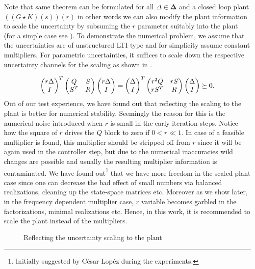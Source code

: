 \begin{rem}

Note that same theorem can be formulated for all $\Delta\in\bm{\Delta}$ and a closed loop plant $\left((G\star K) (s) \right)(r)$
in other words we can also modify the plant information to scale the uncertainty by subsuming the $r$ parameter suitably into the 
plant (for a simple case see ).
To demonstrate the numerical problem, we assume that the uncertainties are of unstructured LTI type and for simplicity assume constant multipliers. 
For parametric uncertainties, it suffices to scale down the respective uncertainty channels for the scaling as shown in . 

\[
\begin{pmatrix}r\Delta\\I\end{pmatrix}^T\begin{pmatrix}Q&S\\S^T&R\end{pmatrix}\begin{pmatrix}r\Delta\\I\end{pmatrix} = \begin{pmatrix}\Delta\\I\end{pmatrix}^T\begin{pmatrix}r^2 Q&rS\\rS^T&R\end{pmatrix}\begin{pmatrix}\Delta\\I\end{pmatrix}\succeq 0.
\]
Out of our test experience, we have found out that reflecting the scaling to the plant is better for numerical stability. Seemingly the reason for 
this is the numerical noise introduced when $r$ is small in the early iteration steps. Notice how the square of $r$ drives the $Q$ block to zero
if $0<r\ll 1$. In case of a feasible multiplier is found, this multiplier should be stripped off from $r$ since it will be again used in the 
controller step, but due to the numerical inaccuracies wild changes are possible and usually the resulting multiplier information is contaminated. 
We have found out\footnote{Initially suggested by C\'esar Lop\'ez during the experiments.} that we have more freedom in the scaled plant case since
one can decrease the bad effect of small numbers via balanced realizations, cleaning up the state-space matrices etc. Moreover as we show later,
in the frequency dependent multiplier case, $r$ variable becomes garbled in the factorizations, minimal realizations etc. Hence, in this work, it 
is recommended to scale the plant instead of the multipliers.
\end{rem}

\begin{figure}%
\centering%
\caption{Reflecting the uncertainty scaling to the plant}%
\label{fig:uncscale}%
\end{figure}


